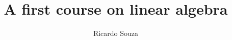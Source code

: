 \documentclass[numbers,12pt]{report}
\title{A first course on linear algebra}
\author{Ricardo Souza}
\numberwithin{rmk}{subsection}
\numberwithin{exerc}{section}
\numberwithin{df}{subsection}
\numberwithin{equation}{df}
\begin{document}
	\maketitle

\tableofcontents

\pagebreak

\pagebreak


%
% 
\end{document}
